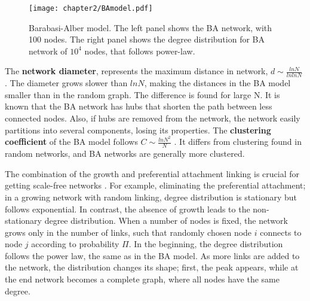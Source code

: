 \begin{figure}[h]
	\centering
	\texttt{[image: chapter2/BAmodel.pdf]}
	\caption[Barabasi-Albert model]{Barabasi-Alber model. The left panel shows the BA network, with 100 nodes. The right panel shows the degree distribution for BA network of $10^4$ nodes, that follows power-law.}
	\label{fig:bamodel}
\end{figure}


 
The \textbf{network diameter}, represents the maximum distance in network, $d \sim \frac{lnN}{lnlnN}$ \cite{bollobas2003mathematical}. The diameter grows slower than $lnN$, making the distances in the BA model smaller than in the random graph. The difference is found for large N. It is known that the BA network has hubs that shorten the path between less connected nodes. Also, if hubs are removed from the network, the network easily partitions into several components, losing its properties. The \textbf{clustering coefficient} of the BA model follows $C \sim \frac{ln N^2}{N}$ \cite{bollobas2003mathematical}. It differs from clustering found in random networks, and BA networks are generally more clustered. 

The combination of the growth and preferential attachment linking is crucial for getting scale-free networks \cite{barabasi1999}. For example, eliminating the preferential attachment; in a growing network with random linking, degree distribution is stationary but follows exponential. In contrast, the absence of growth leads to the non-stationary degree distribution. When a number of nodes is fixed, the network grows only in the number of links, such that randomly chosen node $i$ connects to node $j$ according to probability $\Pi$. In the beginning, the degree distribution follows the power law, the same as in the BA model. As more links are added to the network, the distribution changes its shape; first, the peak appears, while at the end network becomes a complete graph, where all nodes have the same degree.  

